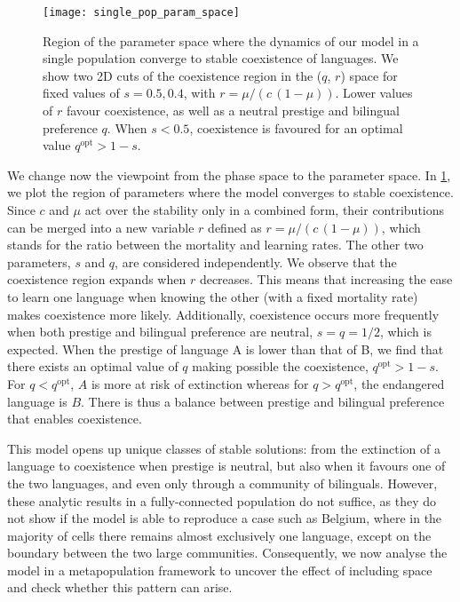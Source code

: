 \documentclass[../thesis.tex]{subfiles}
\begin{document}
\begin{figure}[h]
\centering
    \texttt{[image: single\_pop\_param\_space]}
    \caption{Region of the parameter space where the dynamics of our model in a single
    population converge to stable coexistence of languages. We show two 2D cuts of the
    coexistence region in the ($q$, $r$) space for fixed values of $s=0.5, 0.4$, with $r
    = \mu / (c \, (1-\mu))$. Lower values of $r$ favour coexistence, as well as a
    neutral prestige and bilingual preference $q$. When $s < 0.5$, coexistence is
    favoured for an optimal value $q^\text{opt} > 1-s$.}
    \label{fig:coex_region}
\end{figure}

We change now the viewpoint from the phase space to the parameter space. In
\cref{fig:coex_region}, we plot the region of parameters where the model converges to
stable coexistence. Since $c$ and $\mu$ act over the stability only in a combined form,
their contributions can be merged into a new variable $r$ defined as $r = \mu/(c \,
(1-\mu))$, which stands for the ratio between the mortality and learning rates. The
other two parameters, $s$ and $q$, are considered independently. We observe that the
coexistence region expands when $r$ decreases. This means that increasing the ease to
learn one language when knowing the other (with a fixed mortality rate) makes
coexistence more likely. Additionally, coexistence occurs more frequently when both
prestige and bilingual preference are neutral, $s = q = 1/2$, which is expected. When
the prestige of language A is lower than that of B, we find that there exists an optimal
value of $q$ making possible the coexistence, $q^\text{opt} > 1-s$. For $q <
q^\text{opt}$, $A$ is more at risk of extinction whereas for $q > q^\text{opt}$, the
endangered language is $B$. There is thus a balance between prestige and bilingual
preference that enables coexistence. 

This model opens up unique classes of stable solutions: from the extinction of a
language to coexistence when prestige is neutral, but also when it favours one of the
two languages, and even only through a community of bilinguals. However, these analytic
results in a fully-connected population do not suffice, as they do not show if the model
is able to reproduce a case such as Belgium, where in the majority of cells there
remains almost exclusively one language, except on the boundary between the two large
communities. Consequently, we now analyse the model in a metapopulation framework to
uncover the effect of including space and check whether this pattern can arise.
\end{document}
